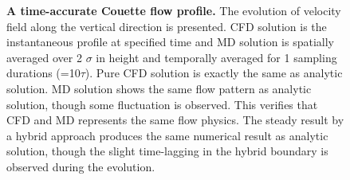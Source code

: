 \documentclass[preprint,12pt]{elsarticle}
\begin{document}
\begin{figure}
\centering
\hskip 1cm
\vskip-0.2cm
\caption[]{\small {\bf A time-accurate Couette flow profile.}
The evolution of velocity field along the vertical direction is presented.
CFD solution is the instantaneous profile at specified time and MD solution
is spatially averaged over 2 $\sigma$ in height and temporally averaged
for 1 sampling durations (=10$\tau$).
 Pure CFD solution is exactly the same as
analytic solution. MD solution shows the same flow pattern as analytic solution,
though some fluctuation is observed. This verifies that CFD and MD represents
the same flow physics.
 The steady result by a hybrid approach produces
the same numerical result as analytic solution, though the slight
time-lagging in the hybrid boundary is observed during the evolution.}
\label{Flat_Plate_Sol}
\end{figure}
\end{document}
